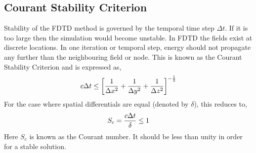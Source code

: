 \subsection{Courant Stability Criterion}
Stability of the FDTD method is governed by the temporal time step $\Delta t$. If it is too large then the simulation would become unstable. In FDTD the fields exist at discrete locations. In one iteration or temporal step, energy should not propagate any further than the neighbouring field or node. This is known as the Courant Stability Criterion and is expressed as,
\begin{equation}
\centering
c \Delta t \leq \left[ \dfrac{1}{\Delta x^2} + \dfrac{1}{\Delta y^2} + \dfrac{1}{\Delta z^2} \right]^{-\frac{1}{2}}
\label{Courant-Stability-Criterion}
\end{equation}
For the case where spatial differentials are equal (denoted by $\delta$), this reduces to,
\begin{equation}
\centering
S_c = \dfrac{c \Delta t}{\delta} \leq 1
\label{Courant-Stability-Criterion-Equal-Differentials}
\end{equation}
Here $S_c$ is known as the Courant number. It should be less than unity in order for a stable solution.
